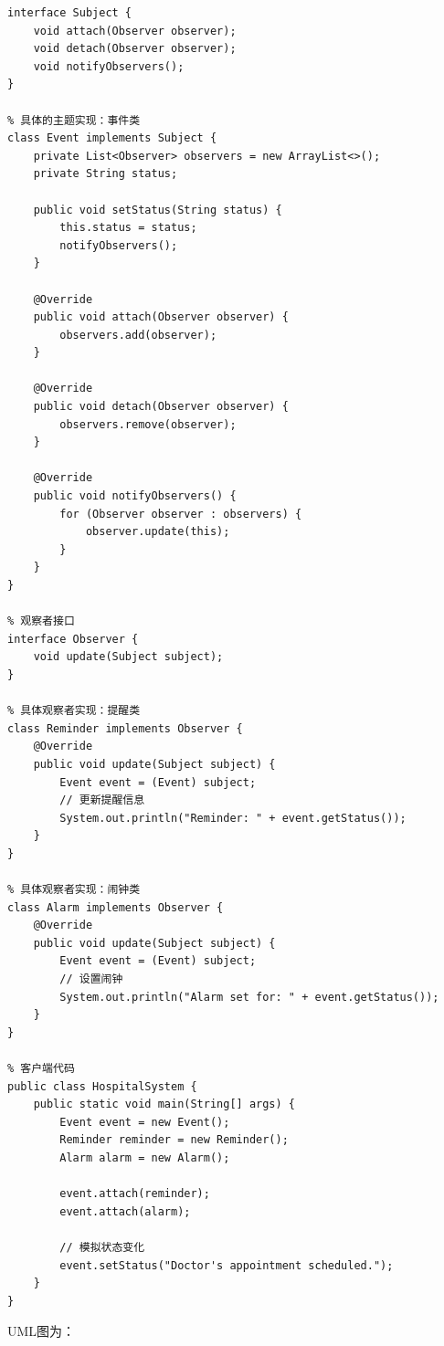 \begin{lstlisting}[caption={观察者例子}]
% 主题接口
interface Subject {
	void attach(Observer observer);
	void detach(Observer observer);
	void notifyObservers();
}

% 具体的主题实现：事件类
class Event implements Subject {
	private List<Observer> observers = new ArrayList<>();
	private String status;
	
	public void setStatus(String status) {
		this.status = status;
		notifyObservers();
	}
	
	@Override
	public void attach(Observer observer) {
		observers.add(observer);
	}
	
	@Override
	public void detach(Observer observer) {
		observers.remove(observer);
	}
	
	@Override
	public void notifyObservers() {
		for (Observer observer : observers) {
			observer.update(this);
		}
	}
}

% 观察者接口
interface Observer {
	void update(Subject subject);
}

% 具体观察者实现：提醒类
class Reminder implements Observer {
	@Override
	public void update(Subject subject) {
		Event event = (Event) subject;
		// 更新提醒信息
		System.out.println("Reminder: " + event.getStatus());
	}
}

% 具体观察者实现：闹钟类
class Alarm implements Observer {
	@Override
	public void update(Subject subject) {
		Event event = (Event) subject;
		// 设置闹钟
		System.out.println("Alarm set for: " + event.getStatus());
	}
}

% 客户端代码
public class HospitalSystem {
	public static void main(String[] args) {
		Event event = new Event();
		Reminder reminder = new Reminder();
		Alarm alarm = new Alarm();
		
		event.attach(reminder);
		event.attach(alarm);
		
		// 模拟状态变化
		event.setStatus("Doctor's appointment scheduled.");
	}
}

\end{lstlisting}
UML图为：
